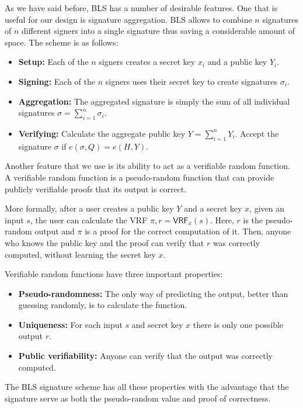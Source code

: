 \documentclass[conference]{IEEEtran}
\begin{document}
As we have said before, BLS has a number of desirable features. One that is useful for our design is signature aggregation. BLS allows to combine $n$ signatures of $n$ different signers into a single signature thus saving a considerable amount of space. The scheme is as follows:

\begin{itemize}
	\item \textbf{Setup:} Each of the $n$ signers creates a secret key $x_i$ and a public key $Y_i$.
	\item \textbf{Signing:} Each of the $n$ signers uses their secret key to create signatures $\sigma_i$.
	\item \textbf{Aggregation:} The aggregated signature is simply the sum of all individual signatures $\sigma=\sum_{i=1}^{n} \sigma_i$.
	\item \textbf{Verifying:} Calculate the aggregate public key $Y=\sum_{i=1}^{n} Y_i$. Accept the signature $\sigma$ if $e(\sigma, Q)=e(H, Y)$.
\end{itemize}

Another feature that we use is its ability to act as a verifiable random function. A verifiable random function is a pseudo-random function that can provide publicly verifiable proofs that its output is correct.

More formally, after a user creates a public key $Y$ and a secret key $x$, given an input $s$, the user can calculate the VRF $\pi,r=\textsf{VRF}_x(s)$. Here, $r$ is the pseudo-random output and $\pi$ is a proof for the correct computation of it. Then, anyone who knows the public key and the proof can verify that $r$ was correctly computed, without learning the secret key $x$.

Verifiable random functions have three important properties:

\begin{itemize}
	\item \textbf{Pseudo-randomness:} The only way of predicting the output, better than guessing randomly, is to calculate the function.
	\item \textbf{Uniqueness:} For each input $s$ and secret key $x$ there is only one possible output $r$.
	\item \textbf{Public verifiability:} Anyone can verify that the output was correctly computed.
\end{itemize}

The BLS signature scheme has all these properties with the advantage that the signature serve as both the pseudo-random value and proof of correctness.
\end{document}
